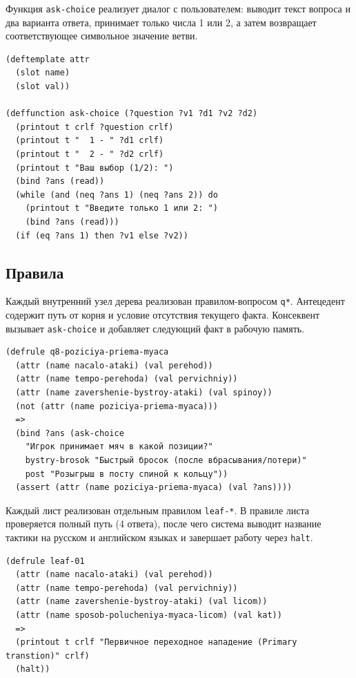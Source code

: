 \documentclass[a4paper, final]{article}
\begin{document}
Функция \texttt{ask-choice} реализует диалог с пользователем: выводит текст вопроса и два варианта ответа, принимает только числа 1 или 2, а затем возвращает соответствующее символьное значение ветви.

\begin{lstlisting}[caption={Шаблон и функция чтения ответа}]
(deftemplate attr
  (slot name)
  (slot val))

(deffunction ask-choice (?question ?v1 ?d1 ?v2 ?d2)
  (printout t crlf ?question crlf)
  (printout t "  1 - " ?d1 crlf)
  (printout t "  2 - " ?d2 crlf)
  (printout t "Ваш выбор (1/2): ")
  (bind ?ans (read))
  (while (and (neq ?ans 1) (neq ?ans 2)) do
    (printout t "Введите только 1 или 2: ")
    (bind ?ans (read)))
  (if (eq ?ans 1) then ?v1 else ?v2))
\end{lstlisting}

\subsection{Правила}

Каждый внутренний узел дерева реализован правилом-вопросом \texttt{q*}. Антецедент содержит путь от корня и условие отсутствия текущего факта. Консеквент вызывает \texttt{ask-choice} и добавляет следующий факт в рабочую память.

\begin{lstlisting}[caption={Пример правила-вопроса (узел 8)}]
(defrule q8-poziciya-priema-myaca
  (attr (name nacalo-ataki) (val perehod))
  (attr (name tempo-perehoda) (val pervichniy))
  (attr (name zavershenie-bystroy-ataki) (val spinoy))
  (not (attr (name poziciya-priema-myaca)))
  =>
  (bind ?ans (ask-choice
    "Игрок принимает мяч в какой позиции?"
    bystry-brosok "Быстрый бросок (после вбрасывания/потери)"
    post "Розыгрыш в посту спиной к кольцу"))
  (assert (attr (name poziciya-priema-myaca) (val ?ans))))
\end{lstlisting}

Каждый лист реализован отдельным правилом \texttt{leaf-*}. В правиле листа проверяется полный путь (4 ответа), после чего система выводит название тактики на русском и английском языках и завершает работу через \texttt{halt}.

\begin{lstlisting}[caption={Пример факта (лист 1 - Первичное переходное нападение)}]
(defrule leaf-01
  (attr (name nacalo-ataki) (val perehod))
  (attr (name tempo-perehoda) (val pervichniy))
  (attr (name zavershenie-bystroy-ataki) (val licom))
  (attr (name sposob-polucheniya-myaca-licom) (val kat))
  =>
  (printout t crlf "Первичное переходное нападение (Primary transtion)" crlf)
  (halt))
\end{lstlisting}
\end{document}
